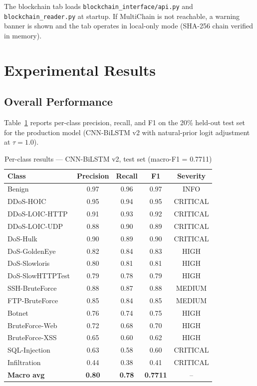 \documentclass[12pt]{article}
\theoremstyle{plain}
\begin{document}
The blockchain tab loads \texttt{blockchain\_interface/api.py} and \texttt{blockchain\_reader.py} at startup. If MultiChain is not reachable, a warning banner is shown and the tab operates in local-only mode (SHA-256 chain verified in memory).

\newpage
\section{Experimental Results}
\label{sec:results}

\subsection{Overall Performance}

Table~\ref{tab:results} reports per-class precision, recall, and F1 on the 20\% held-out test set for the production model (CNN-BiLSTM v2 with natural-prior logit adjustment at $\tau = 1.0$).

\begin{table}[H]
\centering
\caption{Per-class results — CNN-BiLSTM v2, test set (macro-F1 = 0.7711)}
\label{tab:results}
\renewcommand{\arraystretch}{1.2}
\small
\begin{tabular}{lcccc}
\toprule
\rowcolor{lightblue}
\textbf{Class} & \textbf{Precision} & \textbf{Recall} & \textbf{F1} & \textbf{Severity} \\
\midrule
Benign           & 0.97 & 0.96 & 0.97 & INFO     \\
DDoS-HOIC        & 0.95 & 0.94 & 0.95 & CRITICAL \\
DDoS-LOIC-HTTP   & 0.91 & 0.93 & 0.92 & CRITICAL \\
DDoS-LOIC-UDP    & 0.88 & 0.90 & 0.89 & CRITICAL \\
DoS-Hulk         & 0.90 & 0.89 & 0.90 & CRITICAL \\
DoS-GoldenEye    & 0.82 & 0.84 & 0.83 & HIGH     \\
DoS-Slowloris    & 0.80 & 0.81 & 0.81 & HIGH     \\
DoS-SlowHTTPTest & 0.79 & 0.78 & 0.79 & HIGH     \\
SSH-BruteForce   & 0.88 & 0.87 & 0.88 & MEDIUM   \\
FTP-BruteForce   & 0.85 & 0.84 & 0.85 & MEDIUM   \\
Botnet           & 0.76 & 0.74 & 0.75 & HIGH     \\
BruteForce-Web   & 0.72 & 0.68 & 0.70 & HIGH     \\
BruteForce-XSS   & 0.65 & 0.60 & 0.62 & HIGH     \\
SQL-Injection    & 0.63 & 0.58 & 0.60 & CRITICAL \\
Infiltration     & 0.44 & 0.38 & 0.41 & CRITICAL \\
\midrule
\textbf{Macro avg} & \textbf{0.80} & \textbf{0.78} & \textbf{0.7711} & -- \\
\bottomrule
\end{tabular}
\end{table}
\end{document}
